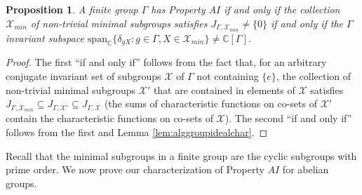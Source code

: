 \documentclass[a4paper, 12pt]{amsart}
\newtheorem{prp}[thm]{Proposition}
\theoremstyle{definition}
\theoremstyle{remark}
\numberwithin{equation}{section}
\begin{document}
\begin{prp}
\label{prp:finitechar}
    A finite group $\Gamma$ has Property $AI$ if and only if the collection $\mathcal{X}_{min}$ of non-trivial minimal subgroups satisfies $J_{\Gamma, \mathcal{X}_{min}}\neq \{0\}$ if and only if the $\Gamma$ invariant subspace $\text{span}_{\mathbb{C}}\{\delta_{gX}: g\in \Gamma, X\in\mathcal{X}_{min}\}\neq \mathbb{C}[\Gamma]$.
\end{prp}
\begin{proof}
    The first ``if and only if'' follows from the fact that, for an arbitrary conjugate invariant set of subgroups $\mathcal{X}$ of $\Gamma$ not containing $\{e\}$, the collection of non-trivial minimal subgroups $\mathcal{X}'$ that are contained in elements of $\mathcal{X}$ satisfies $J_{\Gamma, \mathcal{X}_{min}}\subseteq J_{\Gamma,\mathcal{X}'}\subseteq J_{\Gamma,\mathcal{X}}$ (the sums of characteristic functions on co-sets of $\mathcal{X}'$ contain the characteristic functions on co-sets of $\mathcal{X}$). The second ``if and only if'' follows from the first and Lemma \ref{lem:alggroupidealchar}.
\end{proof}

Recall that the minimal subgroups in a finite group are the cyclic subgroups with prime order. We now prove our characterization of Property $AI$ for abelian groups.
\end{document}
